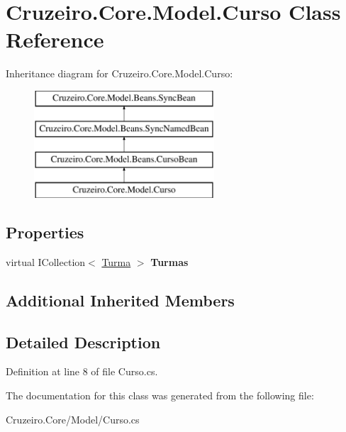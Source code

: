 \hypertarget{class_cruzeiro_1_1_core_1_1_model_1_1_curso}{}\section{Cruzeiro.\+Core.\+Model.\+Curso Class Reference}
\label{class_cruzeiro_1_1_core_1_1_model_1_1_curso}
Inheritance diagram for Cruzeiro.\+Core.\+Model.\+Curso\+:\begin{figure}[H]
\begin{center}
\leavevmode
\includegraphics[height=4.000000cm]{class_cruzeiro_1_1_core_1_1_model_1_1_curso}
\end{center}
\end{figure}
\subsection*{Properties}
\begin{DoxyCompactItemize}
\item 
virtual I\+Collection$<$ \hyperlink{class_cruzeiro_1_1_core_1_1_model_1_1_turma}{Turma} $>$ {\bfseries Turmas}\hypertarget{class_cruzeiro_1_1_core_1_1_model_1_1_curso_ac52c584749323dc0a35c6a79dac080e5}{}\label{class_cruzeiro_1_1_core_1_1_model_1_1_curso_ac52c584749323dc0a35c6a79dac080e5}

\end{DoxyCompactItemize}
\subsection*{Additional Inherited Members}


\subsection{Detailed Description}


Definition at line 8 of file Curso.\+cs.



The documentation for this class was generated from the following file\+:\begin{DoxyCompactItemize}
\item 
Cruzeiro.\+Core/\+Model/Curso.\+cs\end{DoxyCompactItemize}
